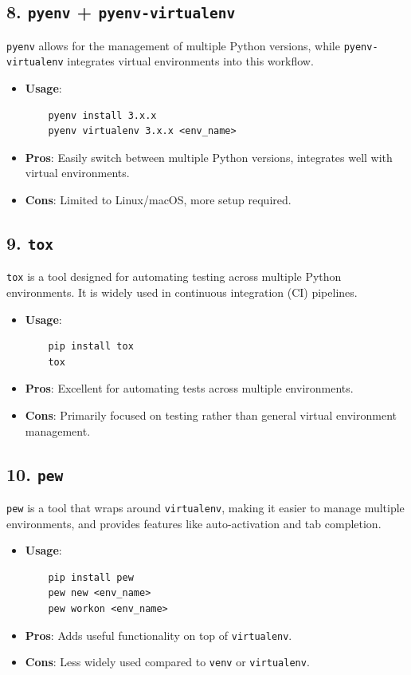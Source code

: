 \documentclass{article}
\begin{document}
\subsection{8. \texttt{pyenv} + \texttt{pyenv-virtualenv}}
\texttt{pyenv} allows for the management of multiple Python versions, while \texttt{pyenv-virtualenv} integrates virtual environments into this workflow.

\begin{itemize}
    \item \textbf{Usage}: 
    \begin{verbatim}
    pyenv install 3.x.x
    pyenv virtualenv 3.x.x <env_name>
    \end{verbatim}
    \item \textbf{Pros}: Easily switch between multiple Python versions, integrates well with virtual environments.
    \item \textbf{Cons}: Limited to Linux/macOS, more setup required.
\end{itemize}

\subsection{9. \texttt{tox}}
\texttt{tox} is a tool designed for automating testing across multiple Python environments. It is widely used in continuous integration (CI) pipelines.

\begin{itemize}
    \item \textbf{Usage}: 
    \begin{verbatim}
    pip install tox
    tox
    \end{verbatim}
    \item \textbf{Pros}: Excellent for automating tests across multiple environments.
    \item \textbf{Cons}: Primarily focused on testing rather than general virtual environment management.
\end{itemize}

\subsection{10. \texttt{pew}}
\texttt{pew} is a tool that wraps around \texttt{virtualenv}, making it easier to manage multiple environments, and provides features like auto-activation and tab completion.

\begin{itemize}
    \item \textbf{Usage}: 
    \begin{verbatim}
    pip install pew
    pew new <env_name>
    pew workon <env_name>
    \end{verbatim}
    \item \textbf{Pros}: Adds useful functionality on top of \texttt{virtualenv}.
    \item \textbf{Cons}: Less widely used compared to \texttt{venv} or \texttt{virtualenv}.
\end{itemize}
\end{document}
